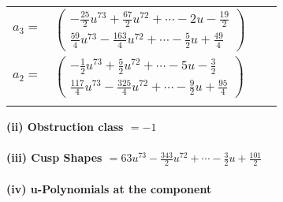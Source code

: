 \documentclass[1p]{elsarticle_modified}
\theoremstyle{definition}
\begin{document}
\begin{tabular}{m{7pt} m{180pt} m{7pt} m{180pt} }
\flushright $a_{3}=$&$\begin{pmatrix}-\frac{25}{2} u^{73}+\frac{67}{2} u^{72}+\cdots-2 u-\frac{19}{2}\\\frac{59}{4} u^{73}-\frac{163}{4} u^{72}+\cdots-\frac{5}{2} u+\frac{49}{4}\end{pmatrix}$ \\
\flushright $a_{2}=$&$\begin{pmatrix}-\frac{1}{2} u^{73}+\frac{5}{2} u^{72}+\cdots-5 u-\frac{3}{2}\\\frac{117}{4} u^{73}-\frac{325}{4} u^{72}+\cdots-\frac{9}{2} u+\frac{95}{4}\end{pmatrix}$\\&\end{tabular}
\flushleft \textbf{(ii) Obstruction class $= -1$}\\~\\
\flushleft \textbf{(iii) Cusp Shapes $= 63 u^{73}-\frac{343}{2} u^{72}+\cdots-\frac{3}{2} u+\frac{101}{2}$}\\~\\
\newpage\renewcommand{\arraystretch}{1}
\flushleft \textbf{(iv) u-Polynomials at the component}\newline \\
\end{document}
